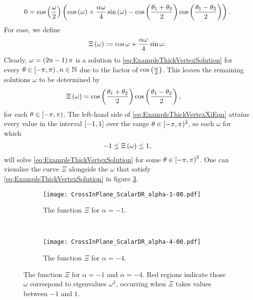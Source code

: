\begin{align} \label{eq:ExampleThickVertexSolution}
	0 = \cos\left( \frac{\omega}{2} \right)
	\left(  \cos\left( \omega \right) + \frac{\alpha\omega}{4}\sin\left( \omega \right) - \cos\left( \frac{\theta_1+\theta_2}{2} \right)\cos\left( \frac{\theta_1-\theta_2}{2} \right)  \right).
\end{align}
For ease, we define
\begin{align*}
	\Xi\left( \omega \right) := \cos\omega + \frac{\alpha\omega}{4}\sin\omega.
\end{align*}
Clearly, $\omega=\left( 2n-1 \right)\pi$ is a solution to \eqref{eq:ExampleThickVertexSolution} for every $\theta\in\left[-\pi,\pi\right), n\in\mathbb{N}$ due to the factor of $\cos\left( \frac{\omega}{2} \right)$.
This leaves the remaining solutions $\omega$ to be determined by
\begin{align} \label{eq:ExampleThickVertexXiEqn}
	\Xi\left( \omega \right) &= \cos\left( \frac{\theta_1+\theta_2}{2} \right)\cos\left( \frac{\theta_1-\theta_2}{2} \right),
\end{align}
for each $\theta\in\left[-\pi,\pi\right)$.
The left-hand side of \eqref{eq:ExampleThickVertexXiEqn} attains every value in the interval $\left[ -1,1 \right]$ over the range $\theta\in[-\pi,\pi)^2$, so each $\omega$ for which
\begin{align} \label{eq:ExampleThickVertexDispExpr}
	-1 \leq \Xi\left( \omega \right) \leq 1,
\end{align}
will solve \eqref{eq:ExampleThickVertexSolution} for some $\theta\in\left[-\pi,\pi\right)^2$.
One can visualise the curve $\Xi$ alongside the $\omega$ that satisfy \eqref{eq:ExampleThickVertexSolution} in figure \ref{fig:CrossInPlane_ScalarDR}.
\begin{figure}[b]
	\centering
	\begin{subfigure}[t]{0.45\textwidth}
		\centering
		\texttt{[image: CrossInPlane\_ScalarDR\_alpha-1-00.pdf]}
		\caption{\label{fig:CrossInPlane_ScalarDR_alpha-1-00} The function $\Xi$ for $\alpha=-1$.}
	\end{subfigure}
	~
	\begin{subfigure}[t]{0.45\textwidth}
		\centering
		\texttt{[image: CrossInPlane\_ScalarDR\_alpha-4-00.pdf]}
		\caption{\label{fig:CrossInPlane_ScalarDR_alpha-4-00} The function $\Xi$ for $\alpha=-4$.}
	\end{subfigure}
	\caption{\label{fig:CrossInPlane_ScalarDR} The function $\Xi$ for $\alpha=-1$ and $\alpha=-4$. Red regions indicate those $\omega$ correspond to eigenvalues $\omega^2$, occurring when $\Xi$ takes values between $-1$ and $1$.}
\end{figure}

